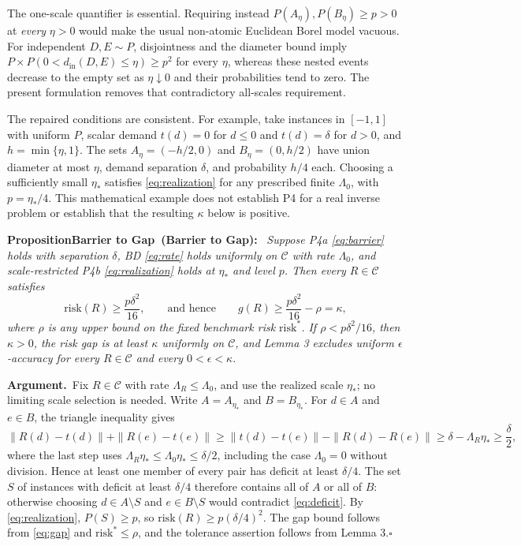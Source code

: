 \documentclass[twoside,11pt]{article}
\newenvironment{uprop}[1][]{\par\medskip\noindent\textbf{Proposition\ifx\relax#1\relax\else\ (#1)\fi:}\ \itshape}{\par\medskip} %
\newcommand{\argument}{\par\medskip\noindent\textbf{Argument.}\ }
\newcommand{\qedbox}{\hfill$\square$}
\begin{document}
The one-scale quantifier is essential. Requiring instead $P(A_\eta),P(B_\eta)\geq p>0$ at \emph{every} $\eta>0$ would make the usual non-atomic Euclidean Borel model vacuous. For independent $D,E\sim P$, disjointness and the diameter bound imply $P\times P(0<d_{\mathrm{in}}(D,E)\leq\eta)\geq p^2$ for every $\eta$, whereas these nested events decrease to the empty set as $\eta\downarrow0$ and their probabilities tend to zero. The present formulation removes that contradictory all-scales requirement.

The repaired conditions are consistent. For example, take instances in $[-1,1]$ with uniform $P$, scalar demand $t(d)=0$ for $d\leq0$ and $t(d)=\delta$ for $d>0$, and $h=\min\{\eta,1\}$. The sets $A_\eta=(-h/2,0)$ and $B_\eta=(0,h/2)$ have union diameter at most $\eta$, demand separation $\delta$, and probability $h/4$ each. Choosing a sufficiently small $\eta_*$ satisfies \eqref{eq:realization} for any prescribed finite $\Lambda_0$, with $p=\eta_*/4$. This mathematical example does not establish P4 for a real inverse problem or establish that the resulting $\kappa$ below is positive.

\begin{uprop}[Barrier to Gap]
Suppose P4a \eqref{eq:barrier} holds with separation $\delta$, BD \eqref{eq:rate} holds uniformly on $\mathcal{C}$ with rate $\Lambda_0$, and scale-restricted P4b \eqref{eq:realization} holds at $\eta_*$ and level $p$. Then every $R\in\mathcal{C}$ satisfies
\begin{equation}
\mathrm{risk}(R)\geq\frac{p\delta^2}{16}, \qquad\text{and hence}\qquad g(R)\geq\frac{p\delta^2}{16}-\rho=\kappa,
\label{eq:floor}%
\end{equation}%
where $\rho$ is any upper bound on the fixed benchmark risk $\mathrm{risk}^*$. If $\rho<p\delta^2/16$, then $\kappa>0$, the risk gap is at least $\kappa$ uniformly on $\mathcal{C}$, and Lemma 3 excludes uniform $\epsilon$-accuracy for every $R\in\mathcal{C}$ and every $0<\epsilon<\kappa$.
\end{uprop}

\argument Fix $R\in\mathcal{C}$ with rate $\Lambda_R\leq\Lambda_0$, and use the realized scale $\eta_*$; no limiting scale selection is needed. Write $A=A_{\eta_*}$ and $B=B_{\eta_*}$. For $d\in A$ and $e\in B$, the triangle inequality gives
\begin{equation}
\|R(d)-t(d)\|+\|R(e)-t(e)\|\geq\|t(d)-t(e)\|-\|R(d)-R(e)\|\geq\delta-\Lambda_R\eta_*\geq\frac{\delta}{2},
\label{eq:deficit}%
\end{equation}%
where the last step uses $\Lambda_R\eta_*\leq\Lambda_0\eta_*\leq\delta/2$, including the case $\Lambda_0=0$ without division. Hence at least one member of every pair has deficit at least $\delta/4$. The set $S$ of instances with deficit at least $\delta/4$ therefore contains all of $A$ or all of $B$: otherwise choosing $d\in A\setminus S$ and $e\in B\setminus S$ would contradict \eqref{eq:deficit}. By \eqref{eq:realization}, $P(S)\geq p$, so $\mathrm{risk}(R)\geq p(\delta/4)^2$. The gap bound follows from \eqref{eq:gap} and $\mathrm{risk}^*\leq\rho$, and the tolerance assertion follows from Lemma 3.\qedbox
\end{document}
